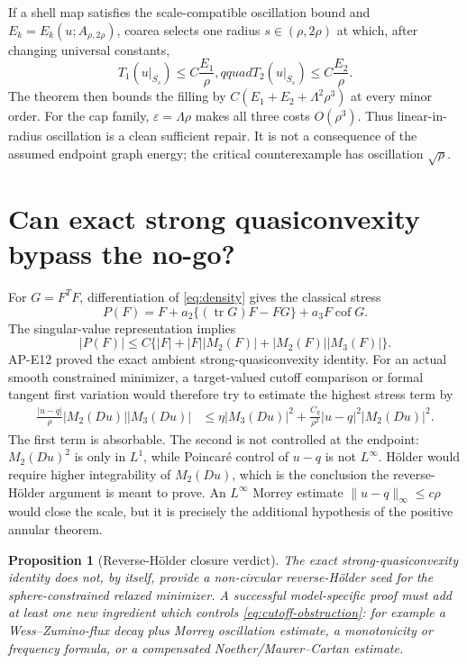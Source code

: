 \documentclass[11pt]{article}
\newtheorem{proposition}[theorem]{Proposition}
\newcommand{\cof}{\operatorname{cof}}
\newcommand{\tr}{\operatorname{tr}}
\begin{document}
If a shell map satisfies the scale-compatible oscillation bound and
$E_k=E_k(u;A_{\rho,2\rho})$, coarea selects one radius
$s\in(\rho,2\rho)$ at which, after changing universal constants,
\begin{equation}
 T_1(u|_{S_s})\leq C\frac{E_1}{\rho},qquad
 T_2(u|_{S_s})\leq C\frac{E_2}{\rho}.
 \label{eq:good-sphere}
\end{equation}
The theorem then bounds the filling by
$C(E_1+E_2+\Lambda^2\rho^3)$ at every minor order.  For the cap family,
$\varepsilon=\Lambda\rho$ makes all three costs $O(\rho^3)$.  Thus
linear-in-radius oscillation is a clean sufficient repair.  It is not a
consequence of the assumed endpoint graph energy; the critical counterexample
has oscillation $\sqrt\rho$.

\section{Can exact strong quasiconvexity bypass the no-go?}

For $G=F^TF$, differentiation of \eqref{eq:density} gives the classical
stress
\begin{equation}
 P(F)=F+a_2\{(\tr G)F-FG\}+a_3F\cof G.
 \label{eq:stress}
\end{equation}
The singular-value representation implies
\begin{equation}
 |P(F)|\leq C\{|F|+|F||M_2(F)|+|M_2(F)||M_3(F)|\}.
 \label{eq:stress-bound}
\end{equation}
AP-E12 proved the exact ambient strong-quasiconvexity identity.  For an
actual smooth constrained minimizer, a target-valued cutoff comparison or
formal tangent first variation would therefore try to estimate the highest
stress term by
\begin{align}
 \frac{|u-q|}{\rho}|M_2(Du)||M_3(Du)|
 &\leq \eta|M_3(Du)|^2
 +\frac{C_\eta}{\rho^2}|u-q|^2|M_2(Du)|^2.
 \label{eq:cutoff-obstruction}
\end{align}
The first term is absorbable.  The second is not controlled at the endpoint:
$M_2(Du)^2$ is only in $L^1$, while Poincar\'e control of $u-q$ is not
$L^\infty$.  H\"older would require higher integrability of $M_2(Du)$, which
is the conclusion the reverse-H\"older argument is meant to prove.  An
$L^\infty$ Morrey estimate $\|u-q\|_\infty\leq c\rho$ would close the scale,
but it is precisely the additional hypothesis of the positive annular
theorem.

\begin{proposition}[Reverse-H\"older closure verdict]
The exact strong-quasiconvexity identity does not, by itself, provide a
non-circular reverse-H\"older seed for the sphere-constrained relaxed
minimizer.  A successful model-specific proof must add at least one new
ingredient which controls \eqref{eq:cutoff-obstruction}: for example a
Wess--Zumino-flux decay plus Morrey oscillation estimate, a monotonicity or
frequency formula, or a compensated Noether/Maurer--Cartan estimate.
\end{proposition}
\end{document}
